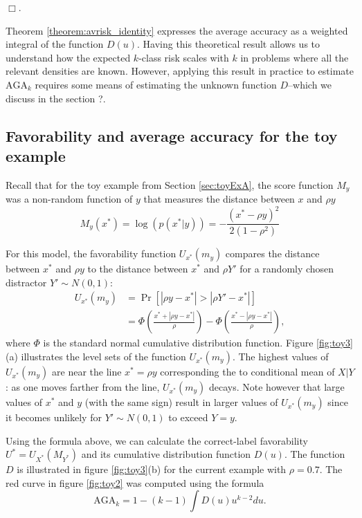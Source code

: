 \documentclass[twoside,11pt]{article}
\begin{document}
$\Box$.


Theorem \ref{theorem:avrisk_identity} expresses the average accuracy
as a weighted integral of the function ${D}(u)$.  Having this
theoretical result allows us to understand how the expected $k$-class
risk scales with $k$ in problems where all the relevant densities are
known.  However, applying this result in practice to estimate
$\text{AGA}_k$ requires some means of estimating the unknown function
${D}$--which we discuss in the section ?.

\subsection{Favorability and average accuracy for the toy example}

Recall that for the toy example from Section \ref{sec:toyExA}, the
score function $M_{y}$ was a non-random function of $y$ that measures
the distance between $x$ and $\rho y$
\[
M_{y}(x^*) = \log(p(x^*|y)) = -\frac{(x^* - \rho y)^2}{2(1-\rho^2)} 
\]

For this model, the favorability function $U_{x^*}(m_y)$ compares the
distance between $x^*$ and $\rho y$ to the distance between $x^*$ and
$\rho Y'$ for a randomly chosen distractor $ Y'\sim N(0,1)$:
\begin{align*}
U_{x^*}(m_y) &= \Pr[|\rho y - x^*|> |\rho Y' - x^*|] 
\\&= \Phi\left(\frac{x^* + |\rho y - x^*|}{\rho}\right) - \Phi\left(\frac{x^* - |\rho y - x^*|}{\rho}\right),
\end{align*}
where $\Phi$ is the standard normal cumulative distribution function.
Figure \ref{fig:toy3}(a) illustrates the level sets of the function
$U_{x^*}(m_y)$.  The highest values of $U_{x^*}(m_y)$ are near the
line $x^* = \rho y$ corresponding the to conditional mean of $X|Y$: as
one moves farther from the line, $U_{x^*}(m_y)$ decays.  Note however
that large values of $x^*$ and $y$ (with the same sign) result in
larger values of $U_{x^*}(m_y)$ since it becomes unlikely for $Y' \sim
N(0,1)$ to exceed $Y = y$.

Using the formula above, we can calculate the correct-label
favorability $U^* = U_{X^*}(M_{Y^*})$ and its cumulative distribution
function ${D}(u)$.  The function ${D}$ is illustrated in figure
\ref{fig:toy3}(b) for the current example with $\rho = 0.7$.  The red
curve in figure \ref{fig:toy2} was computed using the formula
\[
\text{AGA}_k = 1-(k-1) \int {D}(u) u^{k-2} du.
\]
\end{document}
